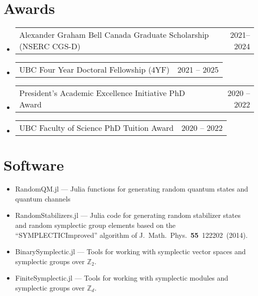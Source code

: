 \documentclass[letterpaper,11pt]{article}
\makeatletter
\newcommand{\AwardsItem}[2]{
	\item{\vspace{-1pt}
		\begin{tabular*}{0.97\textwidth}{l@{\extracolsep{\fill}}r}
			{#1} & {#2}
		\end{tabular*}
		\vspace{-5pt}
	}
}
\makeatother
\begin{document}
\section*{Awards}
\begin{itemize}[leftmargin=*]
	\AwardsItem{Alexander Graham Bell Canada Graduate Scholarship (NSERC CGS-D)}{2021--2024}
	\AwardsItem{UBC Four Year Doctoral Fellowship (4YF)}{2021 -- 2025}
	\AwardsItem{President's Academic Excellence Initiative PhD Award}{2020 -- 2022}
	\AwardsItem{UBC Faculty of Science PhD Tuition Award }{2020 -- 2022}
\end{itemize}

\section*{Software}
\begin{itemize}[leftmargin=*]
	\item RandomQM.jl --- Julia functions for generating random quantum states and quantum channels
	\item RandomStabilizers.jl --- Julia code for generating random stabilizer states and random symplectic group elements based on the ``SYMPLECTICImproved'' algorithm of J.~Math.~Phys.~\textbf{55}~122202~(2014).
	\item BinarySymplectic.jl --- Tools for working with symplectic vector spaces and symplectic groups over $\mathbb{Z}_2$.
	\item FiniteSymplectic.jl --- Tools for working with symplectic modules and symplectic groups over $\mathbb{Z}_d$.
	
\end{itemize}
\end{document}
